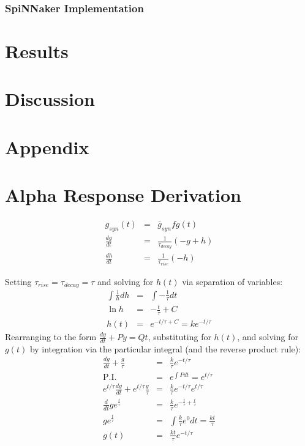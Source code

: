 \documentclass[12pt]{article}
\begin{document}
 \subsubsection*{SpiNNaker Implementation}

\section{Results}

\section{Discussion}
\section{Appendix}
\appendix
\section{Alpha Response Derivation}
\begin{eqnarray}
g_{syn}(t) & = & \bar{g}_{syn}fg(t) \nonumber \\
\frac{dg}{dt} & = & \frac{1}{\tau_{decay}} (-g + h) \nonumber \\
\frac{dh}{dt} & = & \frac{1}{\tau_{rise}}(-h) \nonumber
\label{eqn:alpha_coupled_diff_eqns}
\end{eqnarray}

Setting $\tau_{rise}=\tau_{decay} = \tau$ and solving for $h(t)$ via separation
of variables:
\begin{eqnarray}
\int \frac{1}{h} dh & = & \int -\frac{1}{\tau}dt \nonumber \\
\ln{h}&=&-\frac{t}{\tau} + C \nonumber \\
h(t) & = & e^{-{t/\tau}+C} = ke^{-t / \tau} \nonumber
\label{eqn:solve_for_h}
\end{eqnarray}
Rearranging to the form $\frac{dy}{dt} +Py = Qt$, substituting  for $h(t)$, and
solving for $g(t)$ by integration via the particular integral (and the reverse
product rule):
\begin{eqnarray}
\frac{dg}{dt} + \frac{g}{\tau}&=&\frac{k}{\tau}e^{-t/\tau} \nonumber\\
\mathrm{P.I.}&=& e^{\int P dt} = e^{t/ \tau} \nonumber \\
e^{t/\tau}\frac{dg}{dt} + e^{t/\tau}\frac{g}{\tau}
&=& \frac{k}{\tau}e^{-t/\tau}e^{t/\tau} \nonumber \\
\frac{d}{dt} g e^{\frac{t}{\tau}}&=&\frac{k}{\tau}e^{-\frac{t}{\tau}
+\frac{t}{\tau}} \nonumber \\
g e^{\frac{t}{\tau}} &=& \int \frac{k}{\tau}e^0 dt  =  \frac{kt}{\tau} \nonumber \\
g(t)&=&\frac{kt}{\tau}e^{-t/\tau}
\end{eqnarray}
\end{document}
